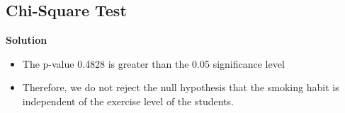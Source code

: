 \documentclass[a4paper,12pt]{article}
\begin{document}
	
	
	\subsection{Chi-Square Test}
	
	\textbf{Solution}\\
	\begin{itemize}
		\item The p-value 0.4828 is greater than the 0.05 significance level \bigskip
		\item Therefore, we do not reject the null hypothesis that the smoking habit is independent of the exercise level of the students.
	\end{itemize}
	
\end{document}
